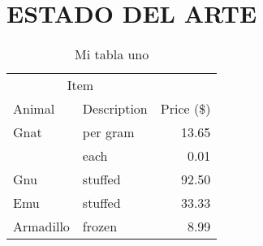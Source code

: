 \chapter{ESTADO DEL ARTE}

\lipsum[1-1] \parencite{latex:companion}

\begin{table}[H]
    \centering
    \begin{tabular}{@{}llr@{}}
        \toprule
        \multicolumn{2}{c}{Item} &                          \\ \cmidrule(r){1-2}
        Animal                   & Description & Price (\$) \\ \midrule
        Gnat                     & per gram    & 13.65      \\
                                 & each        & 0.01       \\
        Gnu                      & stuffed     & 92.50      \\
        Emu                      & stuffed     & 33.33      \\
        Armadillo                & frozen      & 8.99       \\ \bottomrule
    \end{tabular}
    \caption{Mi tabla uno}
    \label{tab:tabla1}
\end{table}